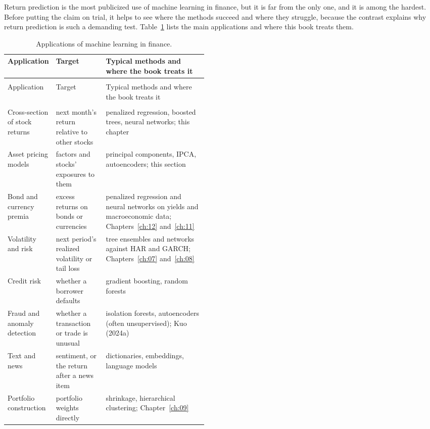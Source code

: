 Return prediction is the most publicized use of machine learning in finance, but it is far from the only one, and it is among the hardest. Before putting the claim on trial, it helps to see where the methods succeed and where they struggle, because the contrast explains why return prediction is such a demanding test. Table~\ref{tab:20-applications} lists the main applications and where this book treats them.

\begingroup
\small
\setlength{\LTpre}{6pt}\setlength{\LTpost}{6pt}
\begin{longtable}{@{}>{\raggedright\arraybackslash}p{0.21\linewidth}>{\raggedright\arraybackslash}p{0.25\linewidth}>{\raggedright\arraybackslash}p{}@{}}
\caption{Applications of machine learning in finance.}
\label{tab:20-applications} \\
\toprule
Application & Target & Typical methods and where the book treats it \\
\midrule
\endfirsthead
\multicolumn{3}{@{}l}{\emph{(continued)}} \\
\toprule
Application & Target & Typical methods and where the book treats it \\
\midrule
\endhead
\midrule
\multicolumn{3}{r@{}}{\emph{(continued on the next page)}} \\
\endfoot
\bottomrule
\endlastfoot
Cross-section of stock returns & next month's return relative to other stocks & penalized regression, boosted trees, neural networks; this chapter \\*
Asset pricing models & factors and stocks' exposures to them & principal components, IPCA, autoencoders; this section \\
Bond and currency premia & excess returns on bonds or currencies & penalized regression and neural networks on yields and macroeconomic data; Chapters~\ref{ch:12} and~\ref{ch:11} \\
Volatility and risk & next period's realized volatility or tail loss & tree ensembles and networks against HAR and GARCH; Chapters~\ref{ch:07} and~\ref{ch:08} \\
Credit risk & whether a borrower defaults & gradient boosting, random forests \\
Fraud and anomaly detection & whether a transaction or trade is unusual & isolation forests, autoencoders (often unsupervised); Kuo (2024a) \\
Text and news & sentiment, or the return after a news item & dictionaries, embeddings, language models \\*
Portfolio construction & portfolio weights directly & shrinkage, hierarchical clustering; Chapter~\ref{ch:09} \\
\end{longtable}
\endgroup

